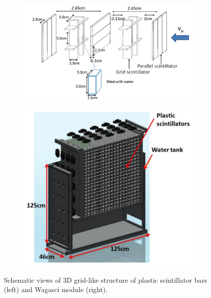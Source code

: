 \begin{figure}[tbhp]
  \begin{center}
   \begin{subfigure}{0.48\textwidth}
     \includegraphics[width=\linewidth]{fig/3d_grid_structure.pdf}
    \end{subfigure}
  \begin{subfigure}{0.48\textwidth}
      \includegraphics[width=\linewidth]{fig/wagasci_mod.pdf}
    \end{subfigure}    
    \end{center}
  \caption{Schematic views of 3D grid-like structure of plastic scintillator bars (left) and Wagasci module (right).}
\label{fig:3dgrid_wagascimod}
\end{figure}


